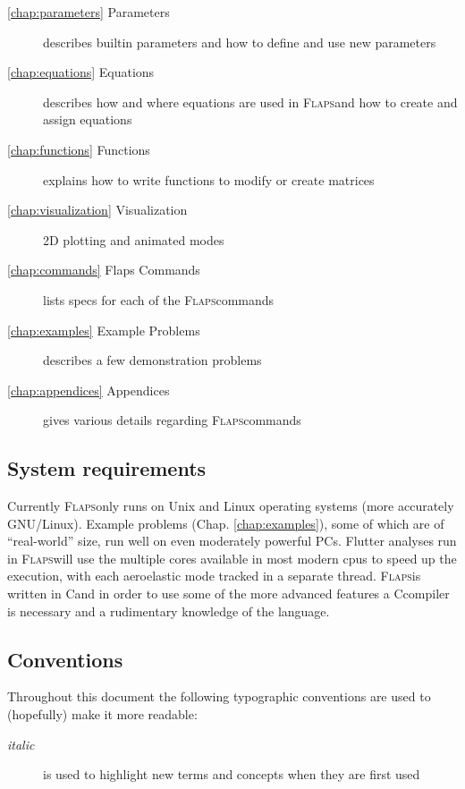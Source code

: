 \documentclass[11pt,openany,twoside]{book}
\numberwithin{equation}{section}		%
\def\Cpp{{C\nolinebreak[4]\hspace{-.05em}\raisebox{.4ex}{\tiny\bf ++}}\:}
\newcommand{\Newterm}[1]{{\em #1}}
\newcommand{\Flaps}{\textsc{Flaps\:}}
\newcommand{\Chapref}[1]{Chap. \ref{#1}}
\begin{document}
{\begin{description}
	\item[\ref{chap:parameters} Parameters]
	describes builtin parameters and how to define and use new parameters

	\item[\ref{chap:equations} Equations]
	describes how and where equations are used in \Flaps and
	how to create and assign equations

	\item[\ref{chap:functions} Functions]
	explains how to write functions to modify or create matrices

	\item[\ref{chap:visualization} Visualization]
	2D plotting and animated modes

	\item[\ref{chap:commands} Flaps Commands]
	lists specs for each of the \Flaps commands

	\item[\ref{chap:examples} Example Problems]
	describes a few demonstration problems

	\item[\ref{chap:appendices} Appendices]
	gives various details regarding \Flaps commands
                
\end{description}
        
\subsection{System requirements}
Currently \Flaps only runs on Unix and Linux operating systems
(more accurately GNU/Linux). Example problems (\Chapref{chap:examples}),
some of which are of ``real-world'' size, run well on even moderately
powerful PCs.
Flutter analyses run in \Flaps will use the multiple cores available
in most modern cpus to speed up the execution, with each aeroelastic
mode tracked in a separate thread.
\Flaps is written in \Cpp and in order to use some of the more advanced
features a \Cpp compiler is necessary and a rudimentary knowledge of
the language.

\subsection{Conventions}
Throughout this document the following typographic conventions
are used to (hopefully) make it more readable:

\begin{description}
	\item[\Newterm{italic}]
		is used to highlight new terms and concepts
		when they are first used
                

\end{description}}
\end{document}
